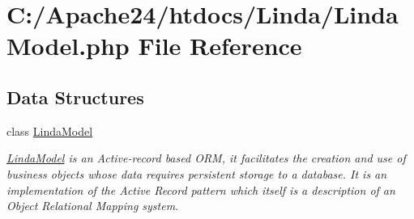\hypertarget{_linda_model_8php}{}\section{C\+:/\+Apache24/htdocs/\+Linda/\+Linda\+Model.php File Reference}
\label{_linda_model_8php}
\subsection*{Data Structures}
\begin{DoxyCompactItemize}
\item 
class \hyperlink{class_linda_model}{Linda\+Model}
\begin{DoxyCompactList}\small\item\em \hyperlink{class_linda_model}{Linda\+Model} is an Active-\/record based O\+R\+M, it facilitates the creation and use of business objects whose data requires persistent storage to a database. It is an implementation of the Active Record pattern which itself is a description of an Object Relational Mapping system. \end{DoxyCompactList}\end{DoxyCompactItemize}
